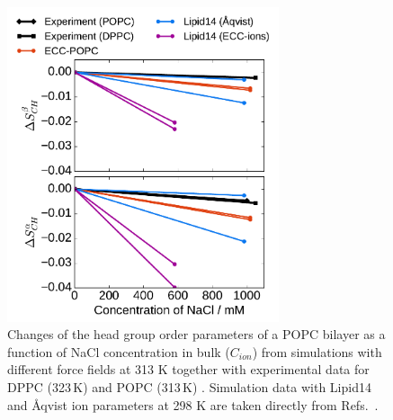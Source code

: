 \documentclass[journal=jpcbfk,manuscript=article]{achemso}
\begin{document}
\begin{figure}[htb!]
  \centering
  \includegraphics[width=8.0cm]{../Fig/ipython_nb/OrdPars-A-B_L14-ECCL17_q80_sig89_NaCl.pdf}
  \caption{\label{fig:delta_ordPar_NaCl}
    Changes of the head group order parameters of a POPC bilayer as a function of NaCl concentration
    in bulk ($C_{ion}$) from simulations with different force fields at 313 K together with 
    experimental data for DPPC (323\,K) \cite{akutsu81} and POPC (313\,K) \cite{altenbach84}.
    Simulation data with Lipid14 and \AA{}qvist ion parameters at 298 K are taken directly from
    Refs.~\cite{lipid14POPC0mMNaClfiles,lipid14POPC1000mMNaClfiles}.
  }
\end{figure}
\end{document}
